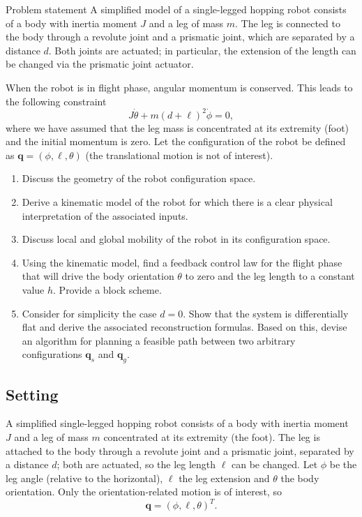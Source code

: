 \documentclass[11pt,a4paper]{article}
\theoremstyle{definition}
\theoremstyle{plain}
\theoremstyle{remark}
\newcommand{\q}{\boldsymbol{q}}
\begin{document}
\begin{problem}{Problem statement}
A simplified model of a single-legged hopping robot consists of a body with inertia moment $J$ and a leg of mass $m$. The leg is connected to the body through a revolute joint and a prismatic joint, which are separated by a distance $d$. Both joints are actuated; in particular, the extension of the length can be changed via the prismatic joint actuator.

When the robot is in flight phase, angular momentum is conserved. This leads to the following constraint
\[
  J\dot\theta+m(d+\ell)^2\dot\phi=0,
\]
where we have assumed that the leg mass is concentrated at its extremity (foot) and the initial momentum is zero.
Let the configuration of the robot be defined as $\q=(\phi,\ell,\theta)$ (the translational motion is not of interest).
\begin{enumerate}[label=(\alph*),nosep]
  \item Discuss the geometry of the robot configuration space.
  \item Derive a kinematic model of the robot for which there is a clear physical interpretation of the associated inputs.
  \item Discuss local and global mobility of the robot in its configuration space.
  \item Using the kinematic model, find a feedback control law for the flight phase that will drive the body orientation $\theta$ to zero and the leg length to a constant value $h$. Provide a block scheme.
  \item Consider for simplicity the case $d=0$. Show that the system is differentially flat and derive the associated reconstruction formulas. Based on this, devise an algorithm for planning a feasible path between two arbitrary configurations $\q_s$ and $\q_g$.
\end{enumerate}
\end{problem}


\subsection{Setting}

A simplified single-legged hopping robot consists of a body with inertia moment $J$ and a leg of mass $m$ concentrated at its extremity (the foot). The leg is attached to the body through a revolute joint and a prismatic joint, separated by a distance $d$; both are actuated, so the leg length $\ell$ can be changed. Let $\phi$ be the leg angle (relative to the horizontal), $\ell$ the leg extension and $\theta$ the body orientation. Only the orientation-related motion is of interest, so
\[
  \q=(\phi,\ell,\theta)^T .
\]
\end{document}
